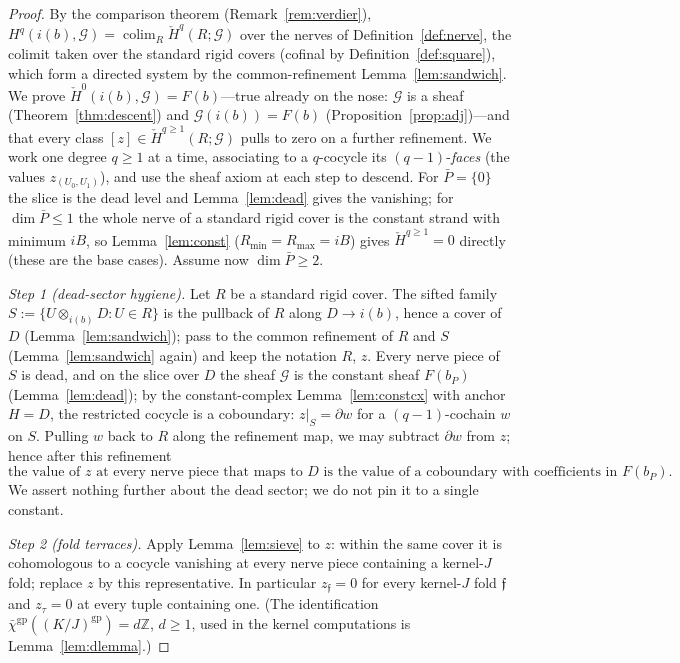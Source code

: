 \documentclass[11pt]{article}
\theoremstyle{definition}
\newcommand{\gp}{\mathrm{gp}}
\newcommand{\colim}{\operatorname*{colim}}
\newcommand{\HH}{\check{H}}
\newcommand{\Z}{\mathbb{Z}}
\begin{document}
\begin{proof}
By the comparison theorem (Remark~\ref{rem:verdier}),
$H^q(i(b),\mathcal G)=\colim_R\HH^q(R;\mathcal G)$ over the nerves
of Definition~\ref{def:nerve}, the colimit taken over the standard
rigid covers (cofinal by Definition~\ref{def:square}), which form a
directed system by the common-refinement
Lemma~\ref{lem:sandwich}. We prove
$\HH^0(i(b),\mathcal G)=F(b)$---true already on the nose:
$\mathcal G$ is a sheaf (Theorem~\ref{thm:descent}) and
$\mathcal G(i(b))=F(b)$ (Proposition~\ref{prop:adj})---and that
every class $[z]\in\HH^{q\ge1}(R;\mathcal G)$ pulls to zero on a
further refinement. We work one degree $q\ge1$ at a time,
associating to a $q$-cocycle its $(q-1)$-\emph{faces} (the values
$z_{(U_0,U_1)}$), and use the sheaf axiom at each step to descend.
For $\bar P=\{0\}$ the slice is the dead level and
Lemma~\ref{lem:dead} gives the vanishing; for $\dim\bar P\le1$ the
whole nerve of a standard rigid cover is the constant strand with
minimum $iB$, so Lemma~\ref{lem:const}
($R_{\min}=R_{\max}=iB$) gives $\HH^{q\ge1}=0$ directly (these are
the base cases). Assume now $\dim\bar P\ge2$.

\emph{Step 1 (dead-sector hygiene).} Let $R$ be a standard rigid
cover. The sifted family $S:=\{U\otimes_{i(b)}D:U\in R\}$ is the
pullback of $R$ along $D\to i(b)$, hence a cover of $D$
(Lemma~\ref{lem:sandwich}); pass to the common refinement of $R$
and $S$ (Lemma~\ref{lem:sandwich} again) and keep the notation
$R$, $z$. Every nerve piece of $S$ is dead, and on the slice over
$D$ the sheaf $\mathcal G$ is the constant sheaf $F(b_P)$
(Lemma~\ref{lem:dead}); by the constant-complex
Lemma~\ref{lem:constcx} with anchor $H=D$, the restricted cocycle
is a coboundary: $z|_S=\partial w$ for a $(q-1)$-cochain $w$ on
$S$. Pulling $w$ back to $R$ along the refinement map, we may
subtract $\partial w$ from $z$; hence after this refinement
\[
\text{the value of }z\text{ at every nerve piece that maps to }D
\text{ is the value of a coboundary with coefficients in }F(b_P).
\tag{$\ast$}
\]
We assert nothing further about the dead sector; we do not pin it
to a single constant.

\emph{Step 2 (fold terraces).} Apply Lemma~\ref{lem:sieve} to
$z$: within the same cover it is cohomologous to a cocycle
vanishing at every nerve piece containing a kernel-$J$ fold;
replace $z$ by this representative. In particular
$z_{\mathfrak f}=0$ for every kernel-$J$ fold $\mathfrak f$ and
$z_\tau=0$ at every tuple containing one. \textup{(}The
identification $\bar\chi^{\gp}((K/J)^{\gp})=d\Z$, $d\ge1$, used
in the kernel computations is Lemma~\ref{lem:dlemma}.\textup{)}


\end{proof}
\end{document}
